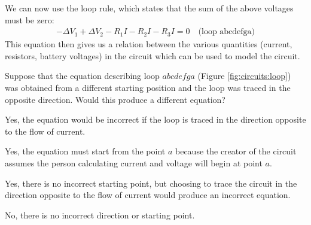 We can now use the loop rule, which states that the sum of the above voltages must be zero:
\begin{align*}
-\Delta V_1 + \Delta V_2 - R_1I - R_2I - R_3I = 0\quad \text{(loop abcdefga)}
\end{align*}
This equation then gives us a relation between the various quantities (current, resistors, battery voltages) in the circuit which can be used to model the circuit.  

\begin{checkpoint}{}
	\begin{MCquestion}{Suppose that the equation describing loop $abcdefga$ (Figure \ref{fig:circuits:loop}) was obtained from a different starting position and the loop was traced in the opposite direction. Would this produce a different equation?}
		\item Yes, the equation would be incorrect if the loop is traced in the direction opposite to the flow of current.
		\item Yes, the equation must start from the point $a$ because the creator of the circuit assumes the person calculating current and voltage will begin at point $a$.
		\item Yes, there is no incorrect starting point, but choosing to trace the circuit in the direction opposite to the flow of current would produce an incorrect equation.
		\item No, there is no incorrect direction or starting point. \correct
	\end{MCquestion}
\end{checkpoint}

